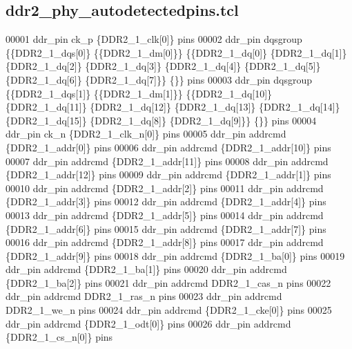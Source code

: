 \subsection{ddr2\+\_\+phy\+\_\+autodetectedpins.\+tcl}
\label{ddr2__phy__autodetectedpins_8tcl_source}

\begin{DoxyCode}
00001 ddr_pin ck\_p \{DDR2\_1\_clk[0]\} pins\textcolor{comment}{}
00002 \textcolor{comment}{}ddr_pin dqsgroup \{\{DDR2\_1\_dqs[0]\} \{\{DDR2\_1\_dm[0]\}\} \{\{DDR2\_1\_dq[0]\} \{DDR2\_1\_dq[1]\} \{DDR2\_1\_dq[2]\}
       \{DDR2\_1\_dq[3]\} \{DDR2\_1\_dq[4]\} \{DDR2\_1\_dq[5]\} \{DDR2\_1\_dq[6]\} \{DDR2\_1\_dq[7]\}\} \{\}\} pins\textcolor{comment}{}
00003 \textcolor{comment}{}ddr_pin dqsgroup \{\{DDR2\_1\_dqs[1]\} \{\{DDR2\_1\_dm[1]\}\} \{\{DDR2\_1\_dq[10]\} \{DDR2\_1\_dq[11]\} \{DDR2\_1\_dq[12]\}
       \{DDR2\_1\_dq[13]\} \{DDR2\_1\_dq[14]\} \{DDR2\_1\_dq[15]\} \{DDR2\_1\_dq[8]\} \{DDR2\_1\_dq[9]\}\} \{\}\} pins\textcolor{comment}{}
00004 \textcolor{comment}{}ddr_pin ck\_n \{DDR2\_1\_clk\_n[0]\} pins\textcolor{comment}{}
00005 \textcolor{comment}{}ddr_pin addrcmd \{DDR2\_1\_addr[0]\} pins\textcolor{comment}{}
00006 \textcolor{comment}{}ddr_pin addrcmd \{DDR2\_1\_addr[10]\} pins\textcolor{comment}{}
00007 \textcolor{comment}{}ddr_pin addrcmd \{DDR2\_1\_addr[11]\} pins\textcolor{comment}{}
00008 \textcolor{comment}{}ddr_pin addrcmd \{DDR2\_1\_addr[12]\} pins\textcolor{comment}{}
00009 \textcolor{comment}{}ddr_pin addrcmd \{DDR2\_1\_addr[1]\} pins\textcolor{comment}{}
00010 \textcolor{comment}{}ddr_pin addrcmd \{DDR2\_1\_addr[2]\} pins\textcolor{comment}{}
00011 \textcolor{comment}{}ddr_pin addrcmd \{DDR2\_1\_addr[3]\} pins\textcolor{comment}{}
00012 \textcolor{comment}{}ddr_pin addrcmd \{DDR2\_1\_addr[4]\} pins\textcolor{comment}{}
00013 \textcolor{comment}{}ddr_pin addrcmd \{DDR2\_1\_addr[5]\} pins\textcolor{comment}{}
00014 \textcolor{comment}{}ddr_pin addrcmd \{DDR2\_1\_addr[6]\} pins\textcolor{comment}{}
00015 \textcolor{comment}{}ddr_pin addrcmd \{DDR2\_1\_addr[7]\} pins\textcolor{comment}{}
00016 \textcolor{comment}{}ddr_pin addrcmd \{DDR2\_1\_addr[8]\} pins\textcolor{comment}{}
00017 \textcolor{comment}{}ddr_pin addrcmd \{DDR2\_1\_addr[9]\} pins\textcolor{comment}{}
00018 \textcolor{comment}{}ddr_pin addrcmd \{DDR2\_1\_ba[0]\} pins\textcolor{comment}{}
00019 \textcolor{comment}{}ddr_pin addrcmd \{DDR2\_1\_ba[1]\} pins\textcolor{comment}{}
00020 \textcolor{comment}{}ddr_pin addrcmd \{DDR2\_1\_ba[2]\} pins\textcolor{comment}{}
00021 \textcolor{comment}{}ddr_pin addrcmd DDR2\_1\_cas\_n pins\textcolor{comment}{}
00022 \textcolor{comment}{}ddr_pin addrcmd DDR2\_1\_ras\_n pins\textcolor{comment}{}
00023 \textcolor{comment}{}ddr_pin addrcmd DDR2\_1\_we\_n pins\textcolor{comment}{}
00024 \textcolor{comment}{}ddr_pin addrcmd \{DDR2\_1\_cke[0]\} pins\textcolor{comment}{}
00025 \textcolor{comment}{}ddr_pin addrcmd \{DDR2\_1\_odt[0]\} pins\textcolor{comment}{}
00026 \textcolor{comment}{}ddr_pin addrcmd \{DDR2\_1\_cs\_n[0]\} pins
\end{DoxyCode}
